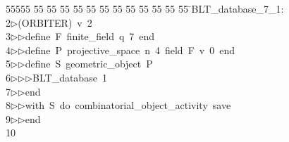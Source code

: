 %
%
\begin{tabbing}
55555 \= 55 \= 55 \= 55 \= 55 \= 55 \= 55 \= 55 \= 55 \= 55 \= 55 \= 55 \= 55 \= \>BLT\_database\_7\_1:\\[0pt]
2\>$\triangleright$\>(ORBITER)\ v\ 2\ \\[0pt]
3\>$\triangleright$\>$\triangleright$\>define\ F\ finite\_field\ q\ 7\ end\ \\[0pt]
4\>$\triangleright$\>$\triangleright$\>define\ P\ projective\_space\ n\ 4\ field\ F\ v\ 0\ end\ \\[0pt]
5\>$\triangleright$\>$\triangleright$\>define\ S\ geometric\_object\ P\ \\[0pt]
6\>$\triangleright$\>$\triangleright$\>$\triangleright$\>BLT\_database\ 1\ \\[0pt]
7\>$\triangleright$\>$\triangleright$\>end\ \\[0pt]
8\>$\triangleright$\>$\triangleright$\>with\ S\ do\ combinatorial\_object\_activity\ save\ \\[0pt]
9\>$\triangleright$\>$\triangleright$\>end\\[0pt]
10\>\end{tabbing}
